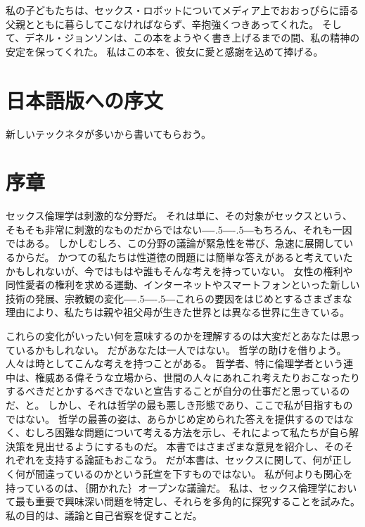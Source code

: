 \documentclass[paper=a4,book,openany]{jlreq}
\def\DDASH{―\kern-.5\zw―\kern-.5\zw―} %
\begin{document}
私の子どもたちは、セックス・ロボットについてメディア上でおおっぴらに語る父親とともに暮らしてこなければならず、辛抱強くつきあってくれた。
そして、デネル・ジョンソンは、この本をようやく書き上げるまでの間、私の精神の安定を保ってくれた。
私はこの本を、彼女に愛と感謝を込めて捧げる。

\chapter*{日本語版への序文}

新しいテックネタが多いから書いてもらおう。
\fi
\mainmatter

\chapter*{序章}
{}

セックス倫理学は刺激的な分野だ。
それは単に、その対象がセックスという、そもそも非常に刺激的なものだからではない{\DDASH}もちろん、それも一因ではある。
しかしむしろ、この分野の議論が緊急性を帯び、急速に展開しているからだ。
かつての私たちは性道徳の問題には簡単な答えがあると考えていたかもしれないが、今ではもはや誰もそんな考えを持っていない。
女性の権利や同性愛者の権利を求める運動、インターネットやスマートフォンといった新しい技術の発展、宗教観の変化{\DDASH}これらの要因をはじめとするさまざまな理由により、私たちは親や祖父母が生きた世界とは異なる世界に生きている。

これらの変化がいったい何を意味するのかを理解するのは大変だとあなたは思っているかもしれない。
だがあなたは一人ではない。
哲学の助けを借りよう。
人々は時としてこんな考えを持つことがある。
哲学者、特に倫理学者という連中は、権威ある偉そうな立場から、世間の人々にあれこれ考えたりおこなったりするべきだとかするべきでないと宣告することが自分の仕事だと思っているのだ、と。
しかし、それは哲学の最も悪しき形態であり、ここで私が目指すものではない。
哲学の最善の姿は、あらかじめ定められた答えを提供するのではなく、むしろ困難な問題について考える方法を示し、それによって私たちが自ら解決策を見出せるようにするものだ。
本書ではさまざまな意見を紹介し、そのそれぞれを支持する論証もおこなう。
だが本書は、セックスに関して、何が正しく何が間違っているのかという託宣を下すものではない。
私が何よりも関心を持っているのは、｛開かれた｝{オープンな}議論だ。
私は、セックス倫理学において最も重要で興味深い問題を特定し、それらを多角的に探究することを試みた。
私の目的は、議論と自己省察を促すことだ。
\end{document}
